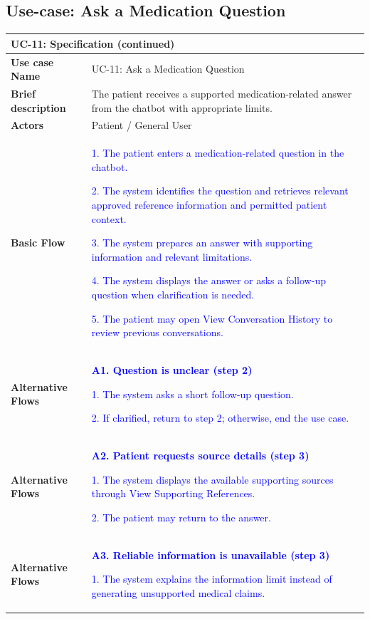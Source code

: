 \subsection{Use-case: Ask a Medication Question}
\label{uc:uc-11}
\begin{longtable}{|p{}|p{}|}
\hline
\endfirsthead
\multicolumn{2}{l}{\textbf{UC-11: Specification (continued)}}\\
\hline
\endhead
\textbf{Use case Name} & UC-11: Ask a Medication Question \\ \hline
\textbf{Brief description} &
The patient receives a supported medication-related answer from the chatbot with appropriate limits.
\\ \hline
\textbf{Actors} & Patient / General User \\ \hline
\textbf{Basic Flow} &
\textcolor{blue}{1. The patient enters a medication-related question in the chatbot.}\par
\textcolor{blue}{2. The system identifies the question and retrieves relevant approved reference information and permitted patient context.}\par
\textcolor{blue}{3. The system prepares an answer with supporting information and relevant limitations.}\par
\textcolor{blue}{4. The system displays the answer or asks a follow-up question when clarification is needed.}\par
\textcolor{blue}{5. The patient may open View Conversation History to review previous conversations.}
\\ \hline
\textbf{Alternative Flows} &
\textcolor{blue}{\textbf{A1. Question is unclear (step 2)}}\par
\textcolor{blue}{1. The system asks a short follow-up question.}\par
\textcolor{blue}{2. If clarified, return to step 2; otherwise, end the use case.}
\\ \hline
\textbf{Alternative Flows} &
\textcolor{blue}{\textbf{A2. Patient requests source details (step 3)}}\par
\textcolor{blue}{1. The system displays the available supporting sources through View Supporting References.}\par
\textcolor{blue}{2. The patient may return to the answer.}
\\ \hline
\textbf{Alternative Flows} &
\textcolor{blue}{\textbf{A3. Reliable information is unavailable (step 3)}}\par
\textcolor{blue}{1. The system explains the information limit instead of generating unsupported medical claims.}

\end{longtable}
